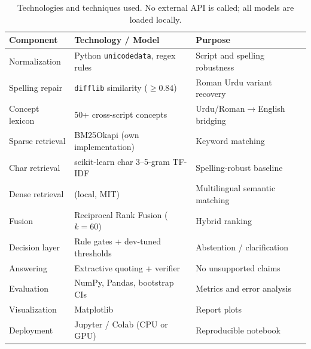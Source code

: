 \documentclass[12pt,a4paper]{article}
\begin{document}
\begin{table}[H]
\centering
\begin{tabular}{@{}>{\raggedright}p{3.4cm}>{\raggedright}p{5.6cm}>{\raggedright\arraybackslash}p{5.0cm}@{}}
\toprule
Component & Technology / Model & Purpose \\
\midrule
Normalization & Python \texttt{unicodedata}, regex rules & Script and spelling robustness \\
Spelling repair & \texttt{difflib} similarity ($\geq 0.84$) & Roman Urdu variant recovery \\
Concept lexicon & 50+ cross-script concepts & Urdu/Roman$\to$English bridging \\
Sparse retrieval & BM25Okapi (own implementation) & Keyword matching \\
Char retrieval & scikit-learn char 3--5-gram TF-IDF & Spelling-robust baseline \\
Dense retrieval & \RDenseModel{} (local, MIT) & Multilingual semantic matching \\
Fusion & Reciprocal Rank Fusion ($k=60$) & Hybrid ranking \\
Decision layer & Rule gates + dev-tuned thresholds & Abstention / clarification \\
Answering & Extractive quoting + verifier & No unsupported claims \\
Evaluation & NumPy, Pandas, bootstrap CIs & Metrics and error analysis \\
Visualization & Matplotlib & Report plots \\
Deployment & Jupyter / Colab (CPU or GPU) & Reproducible notebook \\
\bottomrule
\end{tabular}
\caption{Technologies and techniques used. No external API is called; all models are loaded locally.}
\label{tab:tech}
\end{table}
\end{document}
